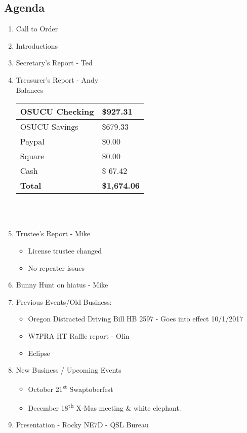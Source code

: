 \documentclass[letter,11pt]{extarticle}
\begin{document}
	\subsection*{Agenda}
	\begin{enumerate}
		\item Call to Order
		\item Introductions
		\item Secretary's Report - Ted
		\item Treasurer's Report - Andy \\
				Balances \\
			\begin{tabular}{|l|l|} \hline
				OSUCU Checking & \$927.31 \\ \hline
				OSUCU Savings & \$679.33 \\ \hline
				Paypal & \$0.00 \\ \hline
				Square & \$0.00 \\ \hline
				Cash & \$ 67.42 \\ \hline
				\textbf{Total} & \textbf{\$1,674.06} \\ \hline
			\end{tabular} \\ \\
		\item Trustee's Report - Mike
			\begin{itemize}
				\item License trustee changed
				\item No repeater issues
			\end{itemize}
		\item Bunny Hunt on hiatus - Mike
		\item Previous Events/Old Business:
			\begin{itemize}
				\item Oregon Distracted Driving Bill HB 2597 - Goes into effect 10/1/2017
				\item W7PRA HT Raffle report - Olin
				\item Eclipse
				\end{itemize}
		\item  New Business / Upcoming Events
			\begin{itemize}
				\item October 21\textsuperscript{st} Swaptoberfest
				\item December 18\textsuperscript{th} X-Mas meeting \& white elephant.
			\end{itemize}
		\item  Presentation - Rocky NE7D - QSL Bureau
	\end{enumerate}
\end{document}

